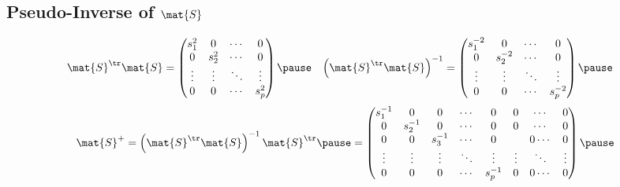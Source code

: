 
\begin{slide}
\section{Pseudo-Inverse of $\mat{S}$}

\begin{PauseHighLight}
\begin{align*}
  \mat{S}^\tr\mat{S} &= \begin{pmatrix}
        s_1^{2} & 0 & \cdots & 0  \\
        0 & s_2^{2} & \cdots & 0  \\
        \vdots & \vdots & \ddots & \vdots\\
        0 & 0 & \cdots & s_p^{2}
        \end{pmatrix}\pause &
  \left(\mat{S}^\tr\mat{S}\right)^{-1}&= \begin{pmatrix}
        s_1^{-2} & 0 & \cdots & 0  \\
        0 & s_2^{-2} & \cdots & 0  \\
        \vdots & \vdots & \ddots & \vdots\\
        0 & 0 & \cdots & s_p^{-2}
        \end{pmatrix}\pause
\end{align*}
\begin{align*}
  \mat{S}^{+}  = \left(\mat{S}^\tr\mat{S}\right)^{-1}\mat{S}^\tr\pause
  = \begin{pmatrix}
        s_1^{-1} & 0 & 0 & \cdots & 0 & 0 & \cdots & 0 \\
        0 & s_2^{-1} & 0 & \cdots & 0 & 0 & \cdots & 0 \\
        0 & 0 & s_3^{-1} & \cdots & 0 & & 0 \cdots & 0 \\
        \vdots & \vdots & \vdots & \ddots & \vdots & \vdots & \ddots & \vdots \\
        0 & 0 & 0 & \cdots & s_p^{-1} & 0 & 0 \cdots & 0
        \end{pmatrix}\pause
\end{align*}
\end{PauseHighLight}
\end{slide}


